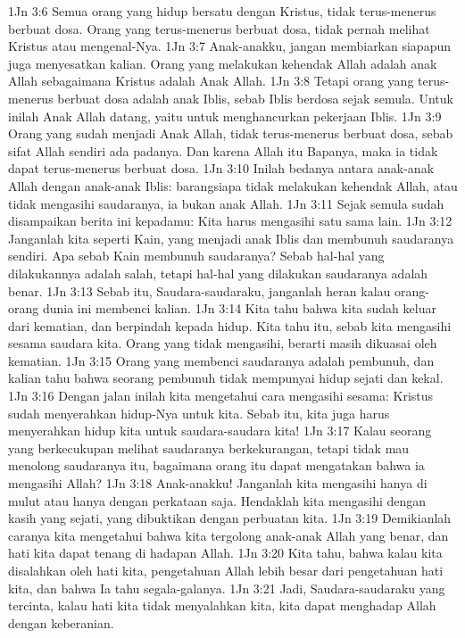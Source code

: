 1Jn 3:6  Semua orang yang hidup bersatu dengan Kristus, tidak terus-menerus berbuat dosa. Orang yang terus-menerus berbuat dosa, tidak pernah melihat Kristus atau mengenal-Nya.
1Jn 3:7  Anak-anakku, jangan membiarkan siapapun juga menyesatkan kalian. Orang yang melakukan kehendak Allah adalah anak Allah sebagaimana Kristus adalah Anak Allah.
1Jn 3:8  Tetapi orang yang terus-menerus berbuat dosa adalah anak Iblis, sebab Iblis berdosa sejak semula. Untuk inilah Anak Allah datang, yaitu untuk menghancurkan pekerjaan Iblis.
1Jn 3:9  Orang yang sudah menjadi Anak Allah, tidak terus-menerus berbuat dosa, sebab sifat Allah sendiri ada padanya. Dan karena Allah itu Bapanya, maka ia tidak dapat terus-menerus berbuat dosa.
1Jn 3:10  Inilah bedanya antara anak-anak Allah dengan anak-anak Iblis: barangsiapa tidak melakukan kehendak Allah, atau tidak mengasihi saudaranya, ia bukan anak Allah.
1Jn 3:11  Sejak semula sudah disampaikan berita ini kepadamu: Kita harus mengasihi satu sama lain.
1Jn 3:12  Janganlah kita seperti Kain, yang menjadi anak Iblis dan membunuh saudaranya sendiri. Apa sebab Kain membunuh saudaranya? Sebab hal-hal yang dilakukannya adalah salah, tetapi hal-hal yang dilakukan saudaranya adalah benar.
1Jn 3:13  Sebab itu, Saudara-saudaraku, janganlah heran kalau orang-orang dunia ini membenci kalian.
1Jn 3:14  Kita tahu bahwa kita sudah keluar dari kematian, dan berpindah kepada hidup. Kita tahu itu, sebab kita mengasihi sesama saudara kita. Orang yang tidak mengasihi, berarti masih dikuasai oleh kematian.
1Jn 3:15  Orang yang membenci saudaranya adalah pembunuh, dan kalian tahu bahwa seorang pembunuh tidak mempunyai hidup sejati dan kekal.
1Jn 3:16  Dengan jalan inilah kita mengetahui cara mengasihi sesama: Kristus sudah menyerahkan hidup-Nya untuk kita. Sebab itu, kita juga harus menyerahkan hidup kita untuk saudara-saudara kita!
1Jn 3:17  Kalau seorang yang berkecukupan melihat saudaranya berkekurangan, tetapi tidak mau menolong saudaranya itu, bagaimana orang itu dapat mengatakan bahwa ia mengasihi Allah?
1Jn 3:18  Anak-anakku! Janganlah kita mengasihi hanya di mulut atau hanya dengan perkataan saja. Hendaklah kita mengasihi dengan kasih yang sejati, yang dibuktikan dengan perbuatan kita.
1Jn 3:19  Demikianlah caranya kita mengetahui bahwa kita tergolong anak-anak Allah yang benar, dan hati kita dapat tenang di hadapan Allah.
1Jn 3:20  Kita tahu, bahwa kalau kita disalahkan oleh hati kita, pengetahuan Allah lebih besar dari pengetahuan hati kita, dan bahwa Ia tahu segala-galanya.
1Jn 3:21  Jadi, Saudara-saudaraku yang tercinta, kalau hati kita tidak menyalahkan kita, kita dapat menghadap Allah dengan keberanian.
